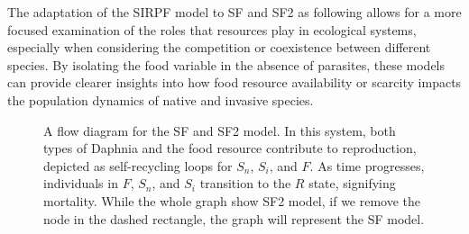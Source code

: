 \documentclass[12pt]{article}
\begin{document}
The adaptation of the SIRPF model to SF and SF2 as following allows for a more focused examination of the roles that resources play in ecological systems, especially when considering the competition or coexistence between different species. By isolating the food variable in the absence of parasites, these models can provide clearer insights into how food resource availability or scarcity impacts the population dynamics of native and invasive species.

\begin{figure}
\begin{center}
\end{center}
\vspace{-5mm}
\caption{A flow diagram for the SF and SF2 model. In this system, both types of Daphnia and the food resource contribute to reproduction, depicted as self-recycling loops for $S_n$, $S_i$, and $F$. As time progresses, individuals in $F$, $S_n$, and $S_i$ transition to the $R$ state, signifying mortality. While the whole graph show SF2 model, if we remove the node in the dashed rectangle, the graph will represent the SF model.}
\label{fig:SF&SF2}
\end{figure}
\end{document}
